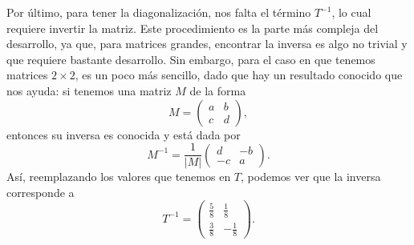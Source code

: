 \documentclass[
  11pt,
  letterpaper,
   addpoints,
   answers
  ]{exam}
\begin{document}
\begin{questions}
\begin{solution}
Por último, para tener la diagonalización, nos falta el término $T^{-1}$, lo cual requiere invertir
la matriz. Este procedimiento es la parte más compleja del desarrollo, ya que, para matrices grandes,
encontrar la inversa es algo no trivial y que requiere bastante desarrollo. Sin embargo, para el caso en que
tenemos matrices $2\times 2$, es un poco más sencillo, dado que hay un resultado conocido que nos ayuda:
si tenemos una matriz $M$ de la forma
\begin{equation}
M=\begin{pmatrix}
a & b\\
c & d
\end{pmatrix},
\end{equation}
entonces su inversa es conocida y está dada por
\begin{equation}
M^{-1}=\frac{1}{|M|}
\begin{pmatrix}
d & -b\\
-c & a
\end{pmatrix}.
\end{equation}
Así, reemplazando los valores que tenemos en $T$, podemos ver que la inversa corresponde a
\begin{equation}
T^{-1}=\begin{pmatrix}
\frac{5}{8} & \frac{1}{8}\\[4pt]
\frac{3}{8} & -\frac{1}{8}
\end{pmatrix}.
\end{equation}


\end{solution}
\end{questions}
\end{document}
